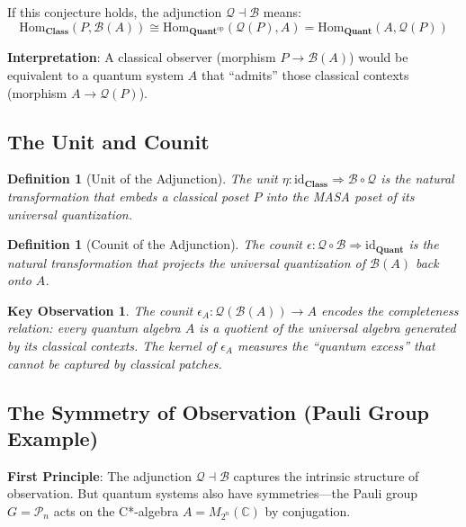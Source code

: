 \documentclass[11pt]{article}
\newtheorem{definition}[theorem]{Definition}
\newtheorem{keyobservation}[theorem]{Key Observation}
\begin{document}
If this conjecture holds, the adjunction $\mathcal{Q} \dashv \mathcal{B}$ means:
\[
\text{Hom}_{\mathbf{Class}}(P, \mathcal{B}(A)) \cong \text{Hom}_{\mathbf{Quant}^{\text{op}}}(\mathcal{Q}(P), A) = \text{Hom}_{\mathbf{Quant}}(A, \mathcal{Q}(P))
\]

\textbf{Interpretation}: A classical observer (morphism $P \to \mathcal{B}(A)$) would be equivalent to a quantum system $A$ that ``admits'' those classical contexts (morphism $A \to \mathcal{Q}(P)$).

\subsection{The Unit and Counit}
\label{unit-counit}

\begin{definition}[Unit of the Adjunction]\label{def:unit}
The unit $\eta: \text{id}_{\mathbf{Class}} \Rightarrow \mathcal{B} \circ \mathcal{Q}$ is the natural transformation that embeds a classical poset $P$ into the MASA poset of its universal quantization.
\end{definition}

\begin{definition}[Counit of the Adjunction]\label{def:counit}
The counit $\epsilon: \mathcal{Q} \circ \mathcal{B} \Rightarrow \text{id}_{\mathbf{Quant}}$ is the natural transformation that projects the universal quantization of $\mathcal{B}(A)$ back onto $A$.
\end{definition}

\begin{keyobservation}\label{obs:counit}
The counit $\epsilon_A: \mathcal{Q}(\mathcal{B}(A)) \to A$ encodes the completeness relation: every quantum algebra $A$ is a quotient of the universal algebra generated by its classical contexts. The kernel of $\epsilon_A$ measures the ``quantum excess'' that cannot be captured by classical patches.
\end{keyobservation}

\subsection{The Symmetry of Observation (Pauli Group Example)}
\label{symmetry}

\textbf{First Principle}: The adjunction $\mathcal{Q} \dashv \mathcal{B}$ captures the intrinsic structure of observation. But quantum systems also have symmetries---the Pauli group $G = \mathcal{P}_n$ acts on the C*-algebra $A = M_{2^n}(\mathbb{C})$ by conjugation.
\end{document}
